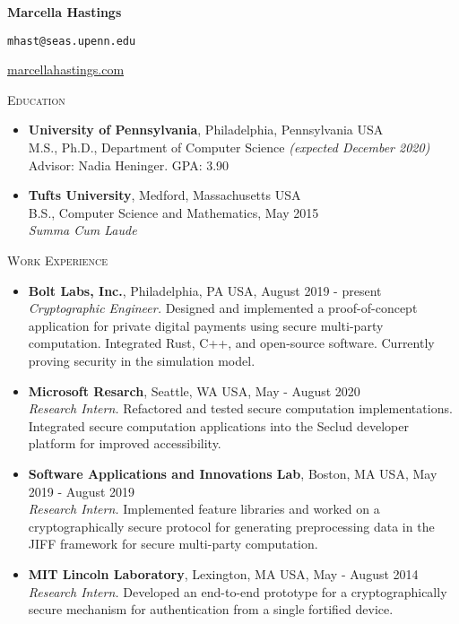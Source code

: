 \documentclass{article}
\newcommand{\textbox}[1]{\parbox{.333\textwidth}{#1}}
\begin{document}
\pagestyle{empty}
\noindent\textbox{\textbf{Marcella Hastings}\hfill}\textbox{\centering \texttt{mhast@seas.upenn.edu}}\textbox{\hfill \href{http://marcellahastings.com}{marcellahastings.com}}

\textsc{Education} \hrulefill
\begin{itemize}[label={}]
  \item \textbf{University of Pennsylvania}, Philadelphia, Pennsylvania USA \\
    M.S., Ph.D., Department of Computer Science \textit{(expected December 2020)}\\
    Advisor: Nadia Heninger. GPA: 3.90
    
  \item \textbf{Tufts University}, Medford, Massachusetts USA \\
    B.S., Computer Science and Mathematics, May 2015 \\
    \textit{Summa Cum Laude}
\end{itemize}

\textsc{Work Experience} \hrulefill
\begin{itemize}[label={}]
  \item \textbf{Bolt Labs, Inc.}, Philadelphia, PA USA, August 2019 - present\\
  \textit{Cryptographic Engineer.} Designed and implemented a proof-of-concept application for private digital payments using secure multi-party computation. Integrated Rust, C++, and open-source software. Currently proving security in the simulation model.
  \item \textbf{Microsoft Resarch}, Seattle, WA USA, May - August 2020\\
  \textit{Research Intern.} Refactored and tested secure computation implementations. Integrated secure computation applications into the Seclud developer platform for improved accessibility.
  \item \textbf{Software Applications and Innovations Lab}, Boston, MA USA, May 2019 - August 2019\\
  \textit{Research Intern.} Implemented feature libraries and worked on a cryptographically secure protocol for generating preprocessing data in the JIFF framework for secure multi-party computation.
  \item \textbf{MIT Lincoln Laboratory}, Lexington, MA USA, May - August 2014 \\
  \textit{Research Intern.} Developed an end-to-end prototype for a cryptographically secure mechanism for authentication from a single fortified device.
\end{itemize}
\end{document}
